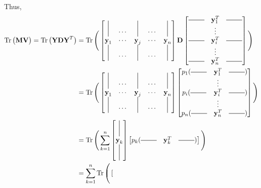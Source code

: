 \begin{notechapter}
Thus, 
\begin{align*}
    \Tr\big(\textbf{M} \textbf{V} \big) = \Tr \big(\textbf{Y} \textbf{D} \textbf{Y}^T \big) &=
    \Tr \Bigg( \begin{bmatrix*}
        \vertbar & \cdots & \vertbar & \cdots & \vertbar\\
        {\textbf{y}}_{1} & \cdots & {\textbf{y}}_{j} & \cdots & {\textbf{y}}_{n}\\
        \vertbar & \cdots & \vertbar & \cdots & \vertbar
    \end{bmatrix*} 
    \textbf{D} 
    \begin{bmatrix*}
        \horzbar &\textbf{y}_{1}^T& \horzbar\\
        &\vdots&\\
        \horzbar &\textbf{y}_{i}^T& \horzbar\\
        &\vdots&\\
        \horzbar &\textbf{y}_{n}^T& \horzbar
    \end{bmatrix*}\Bigg) \\
    &= \Tr \Bigg( \begin{bmatrix*}
        \vertbar & \cdots & \vertbar & \cdots & \vertbar\\
        {\textbf{y}}_{1} & \cdots & {\textbf{y}}_{j} & \cdots & {\textbf{y}}_{n}\\
        \vertbar & \cdots & \vertbar & \cdots & \vertbar
    \end{bmatrix*} 
    \begin{bmatrix*}
        p_1(\horzbar &\textbf{y}_{1}^T& \horzbar)\\
        &\vdots&\\
        p_i(\horzbar &\textbf{y}_{i}^T& \horzbar)\\
        &\vdots&\\
        p_n(\horzbar &\textbf{y}_{n}^T& \horzbar)
    \end{bmatrix*}\Bigg)\\
    &= \Tr \Bigg(\sum_{k=1}^{n} 
    \begin{bmatrix*}
        \vertbar\\
        {\textbf{y}}_{k} \\
        \vertbar
    \end{bmatrix*}
    \begin{bmatrix*}
        p_k(\horzbar &\textbf{y}_{k}^T& \horzbar)
    \end{bmatrix*}\Bigg) \\
    &= \sum_{k=1}^{n} \Tr \Bigg(\begin{bmatrix*}

\end{bmatrix*}
\end{align*}
\end{notechapter}
